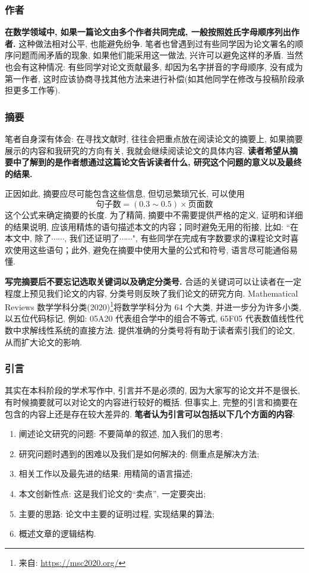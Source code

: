 \documentclass{booki}
\begin{document}
\subsubsection{作者}
\textbf{在数学领域中, 如果一篇论文由多个作者共同完成, 一般按照姓氏字母顺序列出作者.} 这种做法相对公平, 也能避免纷争. 笔者也曾遇到过有些同学因为论文署名的顺序问题而闹矛盾的现象, 如果他们能采用这一做法, 兴许可以避免这样的矛盾. 当然也会有这种情况: 有些同学对论文贡献最多, 却因为名字拼音的字母顺序, 没有成为第一作者, 这时应该协商寻找其他方法来进行补偿(如其他同学在修改与投稿阶段承担更多工作等).
\subsubsection{摘要}
笔者自身深有体会: 在寻找文献时, 往往会把重点放在阅读论文的摘要上, 如果摘要展示的内容和我研究的方向有关, 我就会继续阅读论文的具体内容. \textbf{读者希望从摘要中了解到的是作者想通过这篇论文告诉读者什么, 研究这个问题的意义以及最终的结果.}\par
正因如此, 摘要应尽可能包含这些信息, 但切忌繁琐冗长, 可以使用 $$\text{句子数}=(0.3 \sim 0.5)\times \text{页面数}$$ 这个公式\cite{pakhow}来确定摘要的长度. 为了精简, 摘要中不需要提供严格的定义, 证明和详细的结果说明, 应该用精炼的语句描述本文的内容；同时避免无用的衔接, 比如: {``}在本文中, 除了$\cdots\cdots$, 我们还证明了$\cdots\cdots$", 有些同学在完成有字数要求的课程论文时喜欢使用这些语句；此外, 避免在摘要中使用大量的公式和符号, 语言尽可能通俗易懂. \par
\textbf{写完摘要后不要忘记选取关键词以及确定分类号.} 合适的关键词可以让读者在一定程度上预见我们论文的内容, 分类号则反映了我们论文的研究方向. Mathematical Reviews 数学学科分类(2020)\footnote{来自: \url{https://msc2020.org/}}将数学学科分为 64 个大类, 并进一步分为许多小类, 以五位代码标记, 例如: 05A20 代表组合学中的组合不等式, 65F05 代表数值线性代数中求解线性系统的直接方法. 提供准确的分类号将有助于读者索引我们的论文, 从而扩大论文的影响.
\subsubsection{引言}
其实在本科阶段的学术写作中, 引言并不是必须的, 因为大家写的论文并不是很长, 有时候摘要就可以对论文的内容进行较好的概括. 但事实上, 完整的引言和摘要在包含的内容上还是存在较大差异的. \textbf{笔者认为引言可以包括以下几个方面的内容}:
\begin{enumerate}
    \item 阐述论文研究的问题: 不要简单的叙述, 加入我们的思考{;}
    \item 研究问题时遇到的困难以及我们是如何解决的: 侧重点是解决方法{;}
    \item 相关工作以及最先进的结果: 用精简的语言描述{;}
    \item 本文创新性点: 这是我们论文的{``}卖点'', 一定要突出{;}
    \item 主要的思路: 论文中主要的证明过程, 实现结果的算法{;}
    \item 概述文章的逻辑结构{.}
\end{enumerate}
\end{document}
